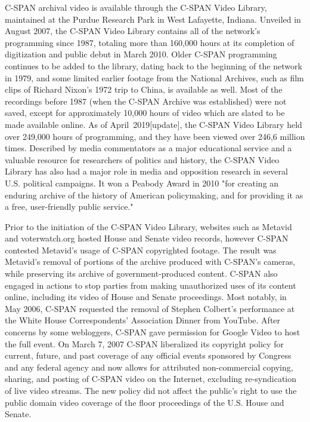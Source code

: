 C-SPAN archival video is available through the C-SPAN Video Library,
maintained at the Purdue Research Park in West Lafayette, Indiana.
Unveiled in August 2007, the C-SPAN Video Library contains all of the
network's programming since 1987, totaling more than 160,000 hours at
its completion of digitization and public debut in March 2010. Older
C-SPAN programming continues to be added to the library, dating back to
the beginning of the network in 1979, and some limited earlier footage
from the National Archives, such as film clips of Richard Nixon's 1972
trip to China, is available as well. Most of the recordings before 1987
(when the C-SPAN Archive was established) were not saved, except for
approximately 10,000 hours of video which are slated to be made
available online. As of April~2019{[}update{]}, the C-SPAN Video Library
held over 249,000 hours of programming, and they have been viewed over
246,6 million times. Described by media commentators as a major
educational service and a valuable resource for researchers of politics
and history, the C-SPAN Video Library has also had a major role in media
and opposition research in several U.S. political campaigns. It won a
Peabody Award in 2010 "for creating an enduring archive of the history
of American policymaking, and for providing it as a free, user-friendly
public service."

Prior to the initiation of the C-SPAN Video Library, websites such as
Metavid and voterwatch.org hosted House and Senate video records,
however C-SPAN contested Metavid's usage of C-SPAN copyrighted footage.
The result was Metavid's removal of portions of the archive produced
with C-SPAN's cameras, while preserving its archive of
government-produced content. C-SPAN also engaged in actions to stop
parties from making unauthorized uses of its content online, including
its video of House and Senate proceedings. Most notably, in May 2006,
C-SPAN requested the removal of Stephen Colbert's performance at the
White House Correspondents' Association Dinner from YouTube. After
concerns by some webloggers, C-SPAN gave permission for Google Video to
host the full event. On March 7, 2007 C-SPAN liberalized its copyright
policy for current, future, and past coverage of any official events
sponsored by Congress and any federal agency and now allows for
attributed non-commercial copying, sharing, and posting of C-SPAN video
on the Internet, excluding re-syndication of live video streams. The new
policy did not affect the public's right to use the public domain video
coverage of the floor proceedings of the U.S. House and Senate.


